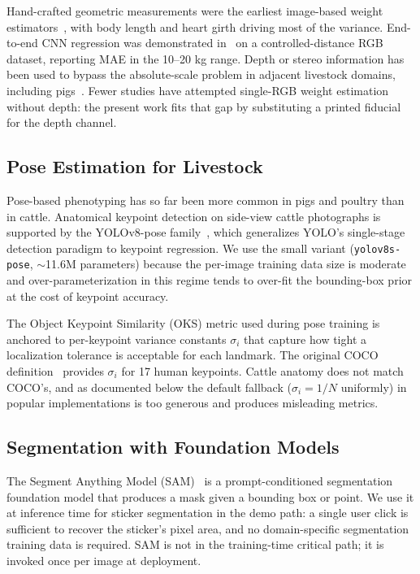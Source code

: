 \documentclass[conference]{IEEEtran}
\begin{document}
Hand-crafted geometric measurements were the earliest image-based weight estimators~\cite{ozkaya2013}, with body length and heart girth driving most of the variance. End-to-end CNN regression was demonstrated in~\cite{gjergji2021} on a controlled-distance RGB dataset, reporting MAE in the 10--20 kg range. Depth or stereo information has been used to bypass the absolute-scale problem in adjacent livestock domains, including pigs~\cite{wang2022,qiao2021}. Fewer studies have attempted single-RGB weight estimation without depth: the present work fits that gap by substituting a printed fiducial for the depth channel.

\subsection{Pose Estimation for Livestock}

Pose-based phenotyping has so far been more common in pigs and poultry than in cattle. Anatomical keypoint detection on side-view cattle photographs is supported by the YOLOv8-pose family~\cite{jocher2023}, which generalizes YOLO's single-stage detection paradigm to keypoint regression. We use the small variant (\texttt{yolov8s-pose}, $\sim$11.6M parameters) because the per-image training data size is moderate and over-parameterization in this regime tends to over-fit the bounding-box prior at the cost of keypoint accuracy.

The Object Keypoint Similarity (OKS) metric used during pose training is anchored to per-keypoint variance constants $\sigma_i$ that capture how tight a localization tolerance is acceptable for each landmark. The original COCO definition~\cite{lin2014} provides $\sigma_i$ for 17 human keypoints. Cattle anatomy does not match COCO's, and as documented below the default fallback ($\sigma_i = 1/N$ uniformly) in popular implementations is too generous and produces misleading metrics.

\subsection{Segmentation with Foundation Models}

The Segment Anything Model (SAM)~\cite{kirillov2023} is a prompt-conditioned segmentation foundation model that produces a mask given a bounding box or point. We use it at inference time for sticker segmentation in the demo path: a single user click is sufficient to recover the sticker's pixel area, and no domain-specific segmentation training data is required. SAM is not in the training-time critical path; it is invoked once per image at deployment.
\end{document}
